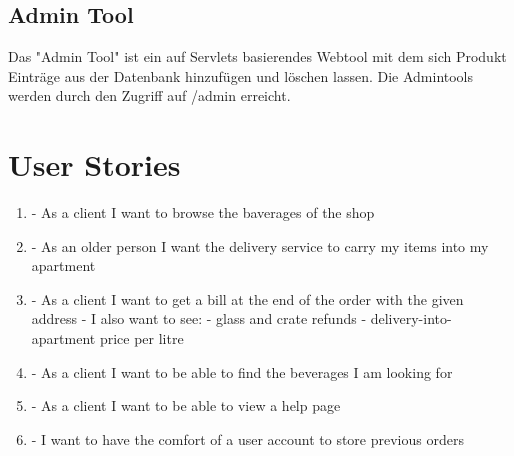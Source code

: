 \documentclass[a4paper, 11pt]{article}
\begin{document}
\subsection{Admin Tool}
Das "Admin Tool" ist ein auf Servlets basierendes Webtool mit dem sich Produkt Einträge aus der Datenbank hinzufügen und löschen lassen. Die Admintools werden durch den Zugriff auf /admin erreicht. 

\section{User Stories}
\begin{enumerate}
	\item- As a client I want to browse the baverages of the shop
	\item- As an older person I want the delivery service to carry my items into my apartment
	\item- As a client I want to get a bill at the end of the order with the given address
		- I also want to see:
			- glass and crate refunds
			- delivery-into-apartment price per litre
	\item- As a client I want to be able to find the beverages I am looking for
	\item- As a client I want to be able to view a help page
	\item- I want to have the comfort of a user account to store previous orders
	\end{enumerate}
\end{document}
